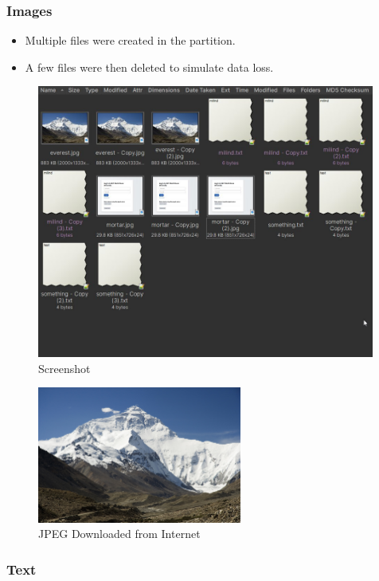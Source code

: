\documentclass[11pt]{article}
\begin{document}
\subsubsection{Images}
\begin{itemize}
    \item Multiple files were created in the partition.
    \item A few files were then deleted to simulate data loss.
\end{itemize}
\begin{figure}[H]
    \centering
    \includegraphics[width=0.99\textwidth]{folder.jpg}
    \caption{Screenshot}
    \label{fig:1}
\end{figure}
\begin{figure}[H]
    \centering
    \includegraphics[width=0.6\textwidth]{everest.jpg}
    \caption{JPEG Downloaded from Internet}
    \label{fig:1}
\end{figure}
\subsubsection{Text}
\end{document}
